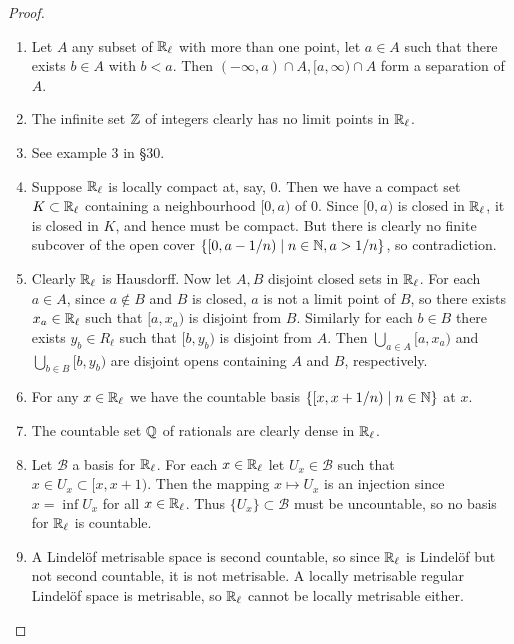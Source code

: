\begin{proof}
  \begin{enumerate}[leftmargin=*]
  \item Let $A$ any subset of $\mathbb{R}_\ell$ with more than one point, let $a \in A$ such that there exists $b \in A$ with $b < a$. Then $(-\infty, a) \cap A, [a, \infty) \cap A$ form a separation of $A$.
  \item The infinite set $\mathbb{Z}$ of integers clearly has no limit points in $\mathbb{R}_\ell$.
  \item See example 3 in \S 30.
  \item Suppose $\mathbb{R}_\ell$ is locally compact at, say, $0$. Then we have a compact set $K \subset \mathbb{R}_\ell$ containing a neighbourhood $[0, a)$ of $0$. Since $[0, a)$ is closed in $\mathbb{R}_\ell$, it is closed in $K$, and hence must be compact. But there is clearly no finite subcover of the open cover $\{[0, a-1/n) \mid n \in \mathbb{N}, a > 1/n\}$, so contradiction.
  \item Clearly $\mathbb{R}_\ell$ is Hausdorff. Now let $A,B$ disjoint closed sets in $\mathbb{R}_\ell$. For each $a \in A$, since $a \notin B$ and $B$ is closed, $a$ is not a limit point of $B$, so there exists $x_a \in \mathbb{R}_\ell$ such that $[a,x_a)$ is disjoint from $B$. Similarly for each $b \in B$ there exists $y_b \in R_\ell$ such that $[b,y_b)$ is disjoint from $A$. Then $\bigcup_{a \in A} [a, x_a)$ and $\bigcup_{b \in B} [b, y_b)$ are disjoint opens containing $A$ and $B$, respectively.
  \item For any $x \in \mathbb{R}_\ell$ we have the countable basis $\{[x, x + 1/n) \mid n \in \mathbb{N}\}$ at $x$.
  \item The countable set $\mathbb{Q}$ of rationals are clearly dense in $\mathbb{R}_\ell$.
  \item Let $\mathcal B$ a basis for $\mathbb{R}_\ell$. For each $x \in \mathbb{R}_\ell$ let $U_x \in \mathcal B$ such that $x \in U_x \subset [x, x+1)$. Then the mapping $x \mapsto U_x$ is an injection since $x = \inf U_x$ for all $x \in \mathbb{R}_\ell$. Thus $\{U_x\} \subset \mathcal B$ must be uncountable, so no basis for $\mathbb{R}_\ell$ is countable.
  \item A Lindel\"of metrisable space is second countable, so since $\mathbb{R}_\ell$ is Lindel\"of but not second countable, it is not metrisable. A locally metrisable regular Lindel\"of space is metrisable, so $\mathbb{R}_\ell$ cannot be locally metrisable either. \qedhere
  \end{enumerate}
\end{proof}


